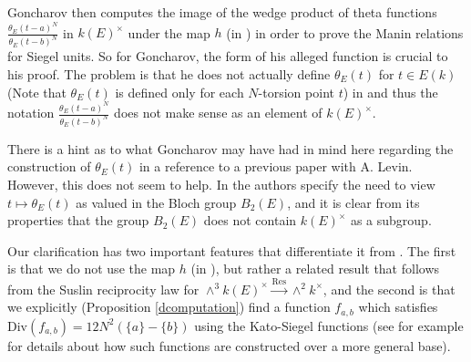 \documentclass[12pt,amstex,amssymb]{article}
\theoremstyle{plain}
\theoremstyle{definition}
\begin{document}
Goncharov then computes the image of the wedge product of theta functions $\frac{\theta_E(t-a)^N}{\theta_E(t-b)^N}$ in $k(E)^\times$ under the map $h$ (in \cite[Theorem 2.4]{Gon}) in order to prove the Manin relations for Siegel units.  %
So for Goncharov, the form of his alleged function is crucial to his proof.
The problem is that he does not actually define $\theta_E(t)$ for $t \in E(k)$ (Note that $\theta_E(t)$ is defined only for each $N$-torsion point $t$) in \cite{Gon} and thus the notation $\frac{\theta_E(t-a)^N}{\theta_E(t-b)^N}$ does not make sense as an element of $k(E)^\times$.
	
There is a hint as to what Goncharov may have had in mind here regarding the construction of $\theta_E(t)$ in a reference \cite{GL} to a previous paper with A. Levin.  However, this does not seem to help. In \cite[Remark, p 400]{GL} the authors specify the need to view $t\mapsto \theta_E(t)$ as valued in the Bloch group $B_2(E)$, and it is clear from its properties that the group $B_2(E)$ does not contain $k(E)^\times$ as a subgroup.



Our clarification has two important features that differentiate it from \cite{Gon}.  
The first is that we do not use the map $h$ (in \cite[Theorem 2.4]{Gon}), but rather a related result that follows from the Suslin reciprocity law for $\wedge^3 k(E)^\times \xrightarrow{\mathrm{Res}} \wedge^2 k^\times$, and the second is that we  explicitly (Proposition \ref{dcomputation}) find a function $f_{a,b}$ which satisfies $\mathrm{Div}(f_{a,b}) = 12N^2 (\{a\}-\{b\})$ using the Kato-Siegel functions (see for example \cite[Theorem 1.2.]{Sch} for details about how such functions are constructed over a more general base). 
\end{document}
